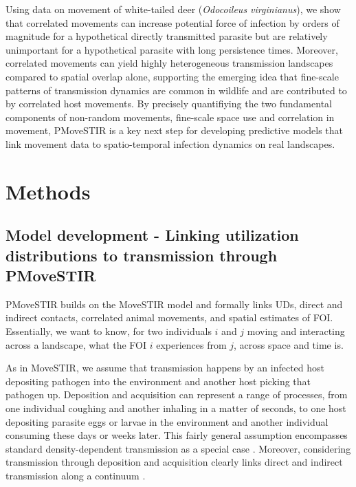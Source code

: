 \documentclass[letterpaper]{article}
\begin{document}
Using data on movement of white-tailed deer (\emph{Odocoileus virginianus}), we show that correlated movements can increase potential force of infection by orders of magnitude for a hypothetical directly transmitted parasite but are relatively unimportant for a hypothetical parasite with long persistence times. Moreover, correlated movements can yield highly heterogeneous transmission landscapes compared to spatial overlap alone, supporting the emerging idea that fine-scale patterns of transmission dynamics are common in wildlife \citep{Albery2021} and are contributed to by correlated host movements. By precisely quantifiying the two fundamental components of non-random movements, fine-scale space use and correlation in movement, PMoveSTIR is a key next step for developing predictive models that link movement data to spatio-temporal infection dynamics on real landscapes.



\section*{Methods}

\subsection*{Model development - Linking utilization distributions to transmission through PMoveSTIR}

PMoveSTIR builds on the MoveSTIR model \citep{Wilber2022} and formally links UDs, direct and indirect contacts, correlated animal movements, and spatial estimates of FOI. Essentially, we want to know, for two individuals $i$ and $j$ moving and interacting across a landscape, what the FOI $i$ experiences from $j$, across space and time is.  

As in MoveSTIR, we assume that transmission happens by an infected host depositing pathogen into the environment and another host picking that pathogen up. 
Deposition and acquisition can represent a range of processes, from one individual coughing and another inhaling in a matter of seconds, to one host depositing parasite eggs or larvae in the environment and another individual consuming these days or weeks later. 
This fairly general assumption encompasses standard density-dependent transmission as a special case \citep{Cortez2021}. 
Moreover, considering transmission through deposition and acquisition clearly links direct and indirect transmission along a continuum \citep{Wilber2022}.
\end{document}
